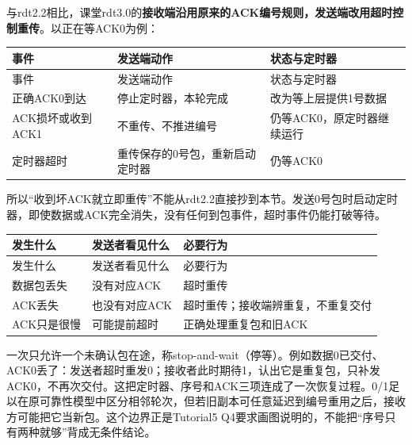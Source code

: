与rdt2.2相比，课堂rdt3.0的\textbf{接收端沿用原来的ACK编号规则，发送端改用超时控制重传}。以正在等ACK0为例：


\begingroup
\small\setlength{\tabcolsep}{3pt}
\renewcommand{\arraystretch}{1.22}
\begin{longtable}{@{}>{\raggedright\arraybackslash}p{}>{\raggedright\arraybackslash}p{}>{\raggedright\arraybackslash}p{}@{}}
\toprule
事件 & 发送端动作 & 状态与定时器 \\
\midrule\endfirsthead
事件 & 发送端动作 & 状态与定时器 \\
\midrule\endhead
\bottomrule\endfoot
正确ACK0到达 & 停止定时器，本轮完成 & 改为等上层提供1号数据 \\
ACK损坏或收到ACK1 & 不重传、不推进编号 & 仍等ACK0，原定时器继续运行 \\
定时器超时 & 重传保存的0号包，重新启动定时器 & 仍等ACK0 \\
\end{longtable}
\endgroup


所以“收到坏ACK就立即重传”不能从rdt2.2直接抄到本节。发送0号包时启动定时器，即使数据或ACK完全消失，没有任何到包事件，超时事件仍能打破等待。


\begingroup
\small\setlength{\tabcolsep}{3pt}
\renewcommand{\arraystretch}{1.22}
\begin{longtable}{@{}>{\raggedright\arraybackslash}p{}>{\raggedright\arraybackslash}p{}>{\raggedright\arraybackslash}p{}@{}}
\toprule
发生什么 & 发送者看见什么 & 必要行为 \\
\midrule\endfirsthead
发生什么 & 发送者看见什么 & 必要行为 \\
\midrule\endhead
\bottomrule\endfoot
数据包丢失 & 没有对应ACK & 超时重传 \\
ACK丢失 & 也没有对应ACK & 超时重传；接收端辨重复，不重复交付 \\
ACK只是很慢 & 可能提前超时 & 正确处理重复包和旧ACK \\
\end{longtable}
\endgroup


一次只允许一个未确认包在途，称stop-and-wait（停等）。例如数据0已交付、ACK0丢了：发送者超时重发0；接收者此时期待1，认出它是重复包，只补发ACK0，不再次交付。这把定时器、序号和ACK三项连成了一次恢复过程。0/1足以在原可靠性模型中区分相邻轮次，但若旧副本可任意延迟到编号重用之后，接收方可能把它当新包。这个边界正是Tutorial5 Q4要求画图说明的，不能把“序号只有两种就够”背成无条件结论。


